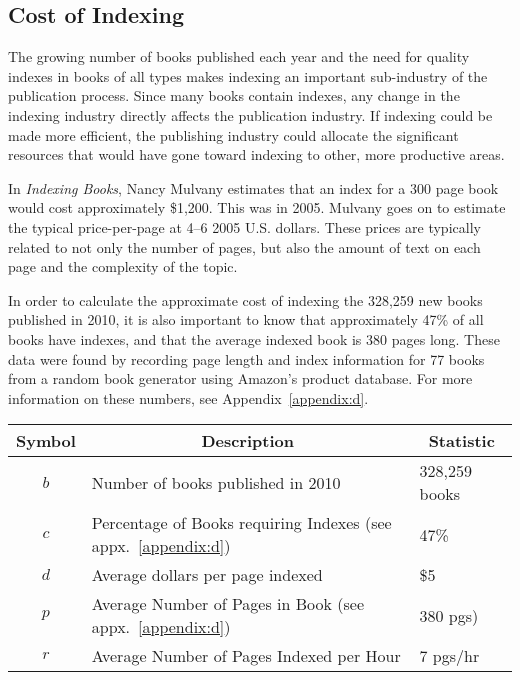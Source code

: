 \subsection{Cost of Indexing}

The growing number of books published each year and the need for quality indexes in books of all types makes indexing an important sub-industry of the publication process.
Since many books contain indexes, any change in the indexing industry directly affects the publication industry.
If indexing could be made more efficient, the publishing industry could allocate the significant resources that would have gone toward indexing to other, more productive areas.

In {\it Indexing Books}, Nancy Mulvany estimates that an index for a 300 page book would cost approximately \$1,200.
This was in 2005.
Mulvany goes on to estimate the typical price-per-page at 4--6 2005 U.S. dollars\cite{mulvany}.
These prices are typically related to not only the number of pages, but also the amount of text on each page and the complexity of the topic.

In order to calculate the approximate cost of indexing the 328,259 new books published in 2010, it is also important to know that approximately 47\% of all books have indexes, and that the average indexed book is 380 pages long.
These data were found by recording page length and index information for 77 books from a random book generator using Amazon's product database. For more information on these numbers, see Appendix~\ref{appendix:d}.

\begin{center}
\begin{tabular}{|c|l|l|}
\hline
\multicolumn{1}{|c|}{{\bf Symbol}} & \multicolumn{1}{c|}{{\bf Description}} & \multicolumn{1}{c|}{{\bf Statistic}} \\
\hline
$b$ & Number of books published in 2010 \cite{bowker} & 328,259 books \\
\hline
$c$ & Percentage of Books requiring Indexes (see appx.~\ref{appendix:d}) & 47\% \\
\hline
$d$ & Average dollars per page indexed \cite{mulvany} & \$5 \\
\hline 
$p$ & Average Number of Pages in Book (see appx.~\ref{appendix:d}) & 380 pgs) \\ 
\hline 
$r$ & Average Number of Pages Indexed per Hour \cite{connolly} & 7 pgs/hr \\
\hline
\end{tabular}
\end{center}

